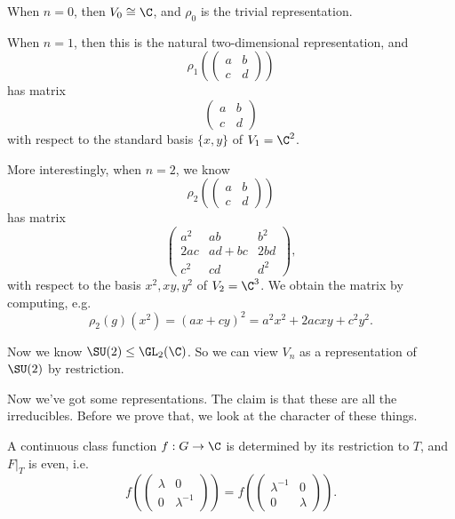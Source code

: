 \documentclass[a4paper]{article}
\begin{document}
\begin{eg}
  When $n = 0$, then $V_0 \cong \C$, and $\rho_0$ is the trivial representation.

  When $n = 1 $, then this is the natural two-dimensional representation, and
  \[
    \rho_1\left(
    \begin{pmatrix}
      a & b\\
      c & d
    \end{pmatrix}
    \right)
  \]
  has matrix
  \[
    \begin{pmatrix}
      a & b\\
      c & d
    \end{pmatrix}
  \]
  with respect to the standard basis $\{x, y\}$ of $V_1 = \C^2$.

  More interestingly, when $n = 2$, we know
  \[
    \rho_2\left(
    \begin{pmatrix}
      a & b\\
      c & d
    \end{pmatrix}
    \right)
  \]
  has matrix
  \[
    \begin{pmatrix}
      a^2 & ab & b^2\\
      2ac & ad + bc & 2bd\\
      c^2 & cd & d^2
    \end{pmatrix},
  \]
  with respect to the basis $x^2, xy, y^2$ of $V_2 = \C^3$. We obtain the matrix by computing, e.g.
  \[
    \rho_2(g) (x^2) = (ax + cy)^2 = a^2 x^2 + 2ac xy + c^2 y^2.
  \]
\end{eg}

Now we know $\SU(2) \leq \GL_2(\C)$. So we can view $V_n$ as a representation of $\SU(2)$ by restriction.

Now we've got some representations. The claim is that these are all the irreducibles. Before we prove that, we look at the character of these things.

\begin{lemma}
  A continuous class function $f: G \to \C$ is determined by its restriction to $T$, and $F|_T$ is even, i.e.
  \[
    f\left(
    \begin{pmatrix}
      \lambda & 0\\
      0 & \lambda^{-1}
    \end{pmatrix}
    \right) =
    f\left(
    \begin{pmatrix}
      \lambda^{-1} & 0\\
      0 & \lambda
    \end{pmatrix}
    \right).
  \]
\end{lemma}
\end{document}
